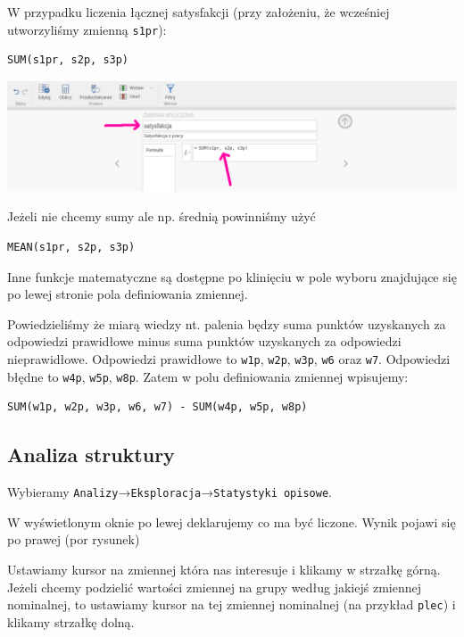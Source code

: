 \documentclass[
  openany]{book}
\begin{document}
W przypadku liczenia łącznej satysfakcji (przy założeniu,
że wcześniej utworzyliśmy zmienną \texttt{s1pr}):

\begin{verbatim}
SUM(s1pr, s2p, s3p)
\end{verbatim}

\includegraphics{./zmienna_satysfakcja.png}

Jeżeli nie chcemy sumy ale np. średnią powinniśmy użyć

\begin{verbatim}
MEAN(s1pr, s2p, s3p)
\end{verbatim}

Inne funkcje matematyczne są dostępne po klinięciu w pole wyboru znajdujące się po lewej
stronie pola definiowania zmiennej.

Powiedzieliśmy że miarą wiedzy nt. palenia będzy suma punktów uzyskanych za odpowiedzi prawidłowe minus
suma punktów uzyskanych za odpowiedzi nieprawidłowe. Odpowiedzi prawidłowe to
\texttt{w1p}, \texttt{w2p}, \texttt{w3p}, \texttt{w6} oraz \texttt{w7}. Odpowiedzi błędne to \texttt{w4p}, \texttt{w5p}, \texttt{w8p}. Zatem
w polu definiowania zmiennej wpisujemy:

\begin{verbatim}
SUM(w1p, w2p, w3p, w6, w7) - SUM(w4p, w5p, w8p)
\end{verbatim}

\hypertarget{analiza-struktury}{%
\subsection{Analiza struktury}\label{analiza-struktury}}

Wybieramy \texttt{Analizy}→\texttt{Eksploracja}→\texttt{Statystyki\ opisowe}.

W wyświetlonym oknie po lewej deklarujemy co ma być liczone. Wynik
pojawi się po prawej (por rysunek)

Ustawiamy kursor na zmiennej która nas interesuje i klikamy w strzałkę górną.
Jeżeli chcemy podzielić wartości zmiennej na grupy według jakiejś
zmiennej nominalnej, to ustawiamy kursor na tej zmiennej nominalnej
(na przykład \texttt{plec}) i klikamy strzałkę dolną.
\end{document}
